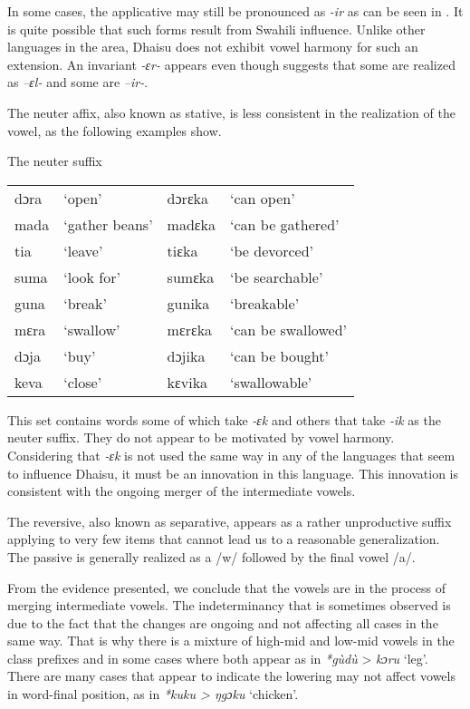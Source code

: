 \documentclass[output=paper,colorlinks,citecolor=brown]{langscibook}
\begin{document}
In some cases, the applicative may still be pronounced as \textit{-ir} as can be seen in \citet[25]{RugemaliraEtAl2019}. It is quite possible that such forms result from Swahili influence. Unlike other languages in the area, Dhaisu does not exhibit vowel harmony for such an extension. An invariant \textit{-ɛr-} appears even though \citet[40]{Nurse2000} suggests that some are realized as \textit{–ɛl-} and some are \textit{–ir-}. 

The neuter affix, also known as stative, is less consistent in the realization of the vowel, as the following examples show.

\ea
    The neuter suffix \\
    \label{tab:ngonyani:16}
    \begin{tabular}{@{}l l l l@{}}
        dɔra & `open' & dɔrɛka & `can open'  \\
         mada & `gather beans' & madɛka & `can be gathered'\\
         tia & `leave' & tiɛka & `be devorced'\\
         suma & `look for' & sumɛka & `be searchable'\\
         guna & `break' & gunika & `breakable'\\
         mɛra & `swallow' & mɛrɛka & `can be swallowed'\\
         dɔja & `buy' & dɔjika & `can be bought'\\
         keva & `close' & kɛvika & `swallowable'
    \end{tabular}
\z

This set contains words some of which take \textit{-ɛk }and others that take \textit{-ik} as the neuter suffix. They do not appear to be motivated by vowel harmony. Considering that \textit{-ɛk} is not used the same way in any of the languages that seem to influence Dhaisu, it must be an innovation in this language. This innovation is consistent with the ongoing merger of the intermediate vowels.

The reversive, also known as separative, appears as a rather unproductive suffix applying to very few items that cannot lead us to a reasonable generalization. The passive is generally realized as a /w/ followed by the final vowel /a/.

From the evidence presented, we conclude that the vowels are in the process of merging intermediate vowels. The indeterminancy that is sometimes observed is due to the fact that the changes are ongoing and not affecting all cases in the same way. That is why there is a mixture of high-mid and low-mid vowels in the class prefixes and in some cases where both appear as in \textit{*gùdù} > \textit{kɔru} `leg'. There are many cases that appear to indicate the lowering may not affect vowels in word-final position, as in \textit{*kuku >  ŋgɔku} `chicken'.
\end{document}
